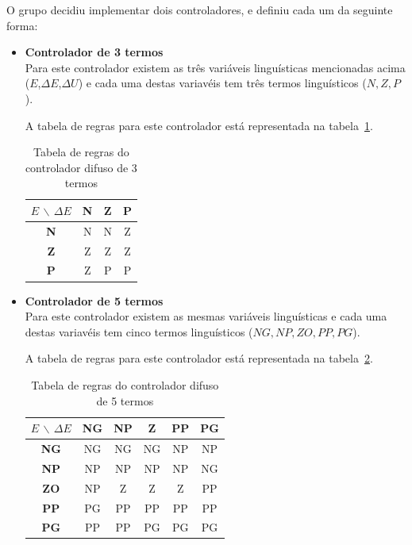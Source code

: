 \documentclass{article}
\begin{document}
O grupo decidiu implementar dois controladores, e definiu cada um da seguinte forma:
\begin{itemize}
\item \textbf{Controlador de 3 termos} \\
Para este controlador existem as três variáveis linguísticas mencionadas acima ($E$,$\Delta E$,$\Delta U$) e cada uma destas variavéis tem três termos linguísticos (${N,Z,P}$).

A tabela de regras para este controlador está representada na tabela~\ref{3_terms_fuzzy}.

\begin{table}[!h]
\centering
	\caption{Tabela de regras do controlador difuso de 3 termos}
	\label{3_terms_fuzzy}
	\begin{tabular}{|c|c|c|c|}
	\hline 
	$E$ $\backslash$ $\Delta E$ & \textbf{N} & \textbf{Z} & \textbf{P} \\ 
	\hline 
	\textbf{N} & N & N & Z \\ 
	\hline 
	\textbf{Z} & Z & Z & Z \\ 
	\hline 
	\textbf{P} & Z & P & P \\ 
	\hline 
	\end{tabular} 
\end{table}


\item \textbf{Controlador de 5 termos} \\
Para este controlador existem as mesmas variáveis linguísticas e cada uma destas variavéis tem cinco termos linguísticos (${NG,NP,ZO,PP,PG}$).

A tabela de regras para este controlador está representada na tabela~\ref{5_terms_fuzzy}.

\begin{table}[!h]
\centering
	\caption{Tabela de regras do controlador difuso de 5 termos}
	\label{5_terms_fuzzy}
	\begin{tabular}{|c|c|c|c|c|c|}
	\hline 
	$E$ $\backslash$ $\Delta E$ & \textbf{NG} & \textbf{NP} & \textbf{Z} & \textbf{PP} & \textbf{PG} \\ 
	\hline 
	\textbf{NG} & NG & NG & NG & NP & NP \\ 
	\hline 
	\textbf{NP} & NP & NP & NP & NP & NG \\ 
	\hline 
	\textbf{ZO} & NP & Z & Z & Z & PP \\ 
	\hline
	\textbf{PP} & PG & PP & PP & PP & PP \\ 
	\hline 
	\textbf{PG} & PP & PP & PG & PG & PG \\ 
	\hline 
	\end{tabular} 
\end{table}
\end{itemize}
\end{document}
